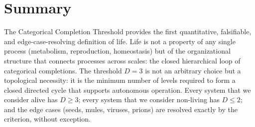 \section{Summary}
\label{sec:life_summary}

The Categorical Completion Threshold provides the first quantitative,
falsifiable, and edge-case-resolving definition of life. Life is not a property
of any single process (metabolism, reproduction, homeostasis) but of
the organizational structure that connects processes across scales: the closed
hierarchical loop of categorical completions. The threshold $D = 3$ is not
an arbitrary choice but a topological necessity: it is the minimum number of
levels required to form a closed directed cycle that supports autonomous
operation. Every system that we consider alive has $D \geq 3$; every system
that we consider non-living has $D \leq 2$; and the edge cases (seeds, mules,
viruses, prions) are resolved exactly by the criterion, without exception.

